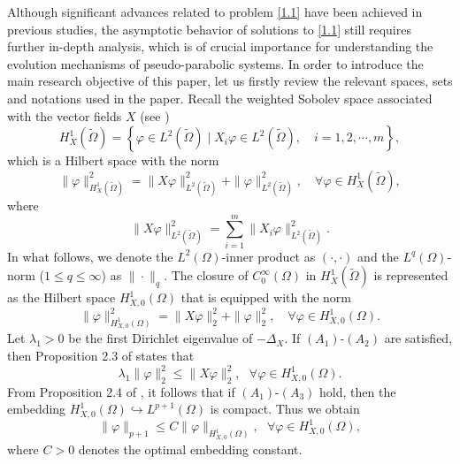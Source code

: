 \documentclass[11pt,a4paper]{article}
\numberwithin{equation}{section}
\numberwithin{remark}{section}
\begin{document}
Although significant advances related to problem \eqref{1.1} have been achieved in previous studies, the asymptotic behavior of solutions to \eqref{1.1} still requires further in-depth analysis, which is of crucial importance for understanding the evolution mechanisms of pseudo-parabolic systems. In order to introduce the main research objective of this paper, let us firstly review the relevant spaces, sets and notations used in the paper. Recall the weighted Sobolev space associated with the vector fields $X$ (see \cite{MR222474})
\begin{equation*}
H_X^1(\tilde{\Omega})=\left\{\varphi\in L^2(\tilde{\Omega})\mid X_i\varphi\in L^2(\tilde{\Omega}),\quad i=1,2,\cdots,m\right\},
\end{equation*}
which is a Hilbert space with the norm
\begin{equation*}
\|\varphi\|_{H_X^1(\tilde{\Omega})}^2=\|X\varphi\|_{L^2(\tilde{\Omega})}^2+\|\varphi\|_{L^2(\tilde{\Omega})}^2,\quad\forall\varphi\in H_X^1(\tilde{\Omega}),
\end{equation*}
where
\begin{equation*}
\|X\varphi\|_{L^2(\tilde{\Omega})}^2=\sum_{i=1}^m\|X_i\varphi\|_{L^2(\tilde{\Omega})}^2.
\end{equation*}
In what follows, we denote the $L^2(\Omega)$-inner product as $(\cdot,\cdot)$ and the $L^q(\Omega)$-norm ($1\leq q\leq\infty$) as $\|\cdot\|_q$. The closure of $C_0^\infty(\Omega)$ in $H_X^1(\tilde{\Omega})$ is represented as the Hilbert space $H_{X,0}^1(\Omega)$ that is equipped with the norm
\begin{equation}\label{Hfanshu}
\|\varphi\|_{H_{X,0}^1(\Omega)}^2=\|X\varphi\|_2^2+\|\varphi\|_2^2,\quad\forall\varphi\in H_{X,0}^1(\Omega).
\end{equation}
Let $\lambda_1>0$ be the first Dirichlet eigenvalue of $-\Delta_X$. If $(A_1)$-$(A_2)$ are satisfied, then Proposition 2.3 of \cite{MR3961341} states that
\begin{equation}\label{tezhengzhi}
\lambda_1\|\varphi\|_2^2\leq\|X\varphi\|_2^2,\ \ \ \forall\varphi\in H_{X,0}^1(\Omega).
\end{equation}
From Proposition 2.4 of \cite{MR4854159}, it follows that if $(A_1)$-$(A_3)$ hold, then the embedding
$H_{X,0}^1(\Omega)\hookrightarrow L^{p+1}(\Omega)$ is compact. Thus we obtain
\begin{equation}\label{x1111-33}
\|\varphi\|_{p+1}\leq C\|\varphi\|_{H_{X,0}^1(\Omega)},\ \ \ \forall\varphi\in H_{X,0}^1(\Omega),
\end{equation}
where $C>0$ denotes the optimal embedding constant.
\end{document}
